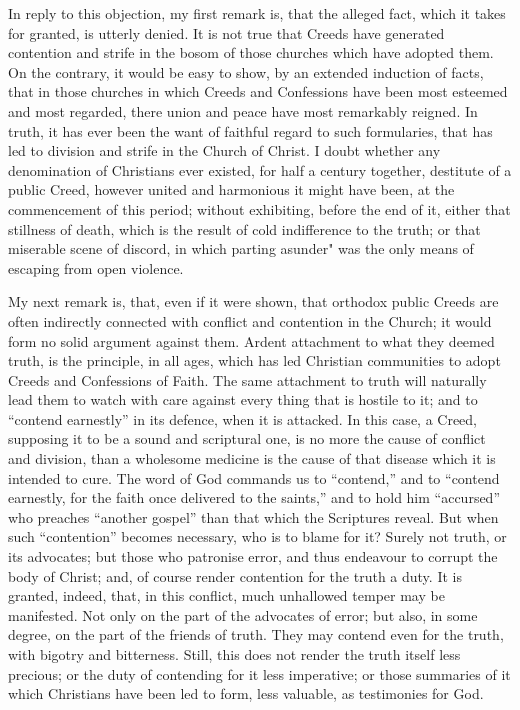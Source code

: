 \documentclass[
]{book}
\begin{document}
In reply to this objection, my first remark is, that the alleged fact, which it takes for granted, is utterly denied. It is not true that Creeds have generated contention and strife in the bosom of those churches which have adopted them. On the contrary, it would be easy to show, by an extended induction of facts, that in those churches in which Creeds and Confessions have been most esteemed and most regarded, there union and peace have most remarkably reigned. In truth, it has ever been the want of faithful regard to such formularies, that has led to division and strife in the Church of Christ. I doubt whether any denomination of Christians ever existed, for half a century together, destitute of a public Creed, however united and harmonious it might have been, at the commencement of this period; without exhibiting, before the end of it, either that stillness of death, which is the result of cold indifference to the truth; or that miserable scene of discord, in which parting asunder" was the only means of escaping from open violence.

My next remark is, that, even if it were shown, that orthodox public Creeds are often indirectly connected with conflict and contention in the Church; it would form no solid argument against them. Ardent attachment to what they deemed truth, is the principle, in all ages, which has led Christian communities to adopt Creeds and Confessions of Faith. The same attachment to truth will naturally lead them to watch with care against every thing that is hostile to it; and to ``contend earnestly'' in its defence, when it is attacked. In this case, a Creed, supposing it to be a sound and scriptural one, is no more the cause of conflict and division, than a wholesome medicine is the cause of that disease which it is intended to cure. The word of God commands us to ``contend,'' and to ``contend earnestly, for the faith once delivered to the saints,'' and to hold him ``accursed'' who preaches ``another gospel'' than that which the Scriptures reveal. But when such ``contention'' becomes necessary, who is to blame for it? Surely not truth, or its advocates; but those who patronise error, and thus endeavour to corrupt the body of Christ; and, of course render contention for the truth a duty. It is granted, indeed, that, in this conflict, much unhallowed temper may be manifested. Not only on the part of the advocates of error; but also, in some degree, on the part of the friends of truth. They may contend even for the truth, with bigotry and bitterness. Still, this does not render the truth itself less precious; or the duty of contending for it less imperative; or those summaries of it which Christians have been led to form, less valuable, as testimonies for God.
\end{document}
